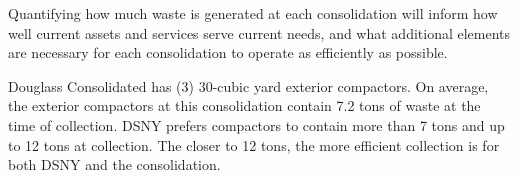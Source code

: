 
    Quantifying how much waste is generated at each consolidation will inform how well current assets and services serve current needs, and what additional elements are necessary for each consolidation to operate as efficiently as possible.
    
    Douglass Consolidated has (3) 30-cubic yard exterior compactors. On average, the exterior compactors at this consolidation contain 7.2 tons of waste at the time of collection. DSNY prefers compactors to contain more than 7 tons and up to 12 tons at collection. The closer to 12 tons, the more efficient collection is for both DSNY and the consolidation.
